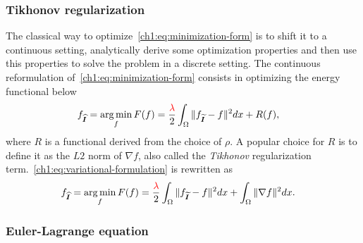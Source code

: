 \subsubsection{Tikhonov regularization}
\label{ch1:subsec:tikhonov-regularization}
The classical way to optimize~\cref{ch1:eq:minimization-form} is to shift it to a continuous setting, analytically derive some optimization properties and then use this properties to solve the problem in a discrete setting. The continuous reformulation of~\cref{ch1:eq:minimization-form} consists in optimizing the energy functional below
\begin{align}
	f_{\bm{\widehat{I}}} &= \operatorname*{arg\,min}_{f} F(f) = \frac{{\color{red}{ \lambda }}}{2} \int_{\Omega}{ \lVert f_{\bm{\widetilde{I}}} - f\rVert^2dx} + R(f),
	\label{ch1:eq:variational-formulation}
\end{align}
%
where $R$ is a functional derived from the choice of $\rho$. A popular choice for $R$ is to define it as the $L2$ norm of $\nabla f$, also called the \emph{Tikhonov} regularization term.~\cref{ch1:eq:variational-formulation} is rewritten as
\begin{align}
	f_{\bm{\widehat{I}}} &= \operatorname*{arg\,min}_{f} F(f) = \frac{{\color{red}{ \lambda }}}{2} \int_{\Omega}{ \lVert f_{\bm{\widetilde{I}}} - f\rVert^2dx} + \int_{\Omega}{ \lVert \nabla f \rVert^2 dx }.
	\label{ch1:tikhonov-formulation}
\end{align}
%
\subsubsection{Euler-Lagrange equation}

